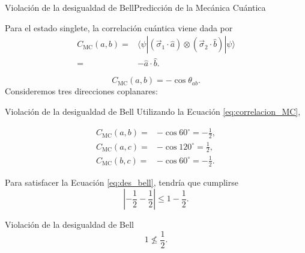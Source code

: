 \begin{frame}{Violación de la desigualdad de Bell}{Predicción de la Mecánica Cuántica}

Para el estado singlete, la correlación cuántica viene dada por
\begin{align*}
	C_{\text{MC}}(a,b)=&\langle\psi|(\vec{\sigma}_1\cdot\hat{a})\otimes(\vec{\sigma}_2\cdot\hat{b})|\psi\rangle
	\\
	=&-\hat{a}\cdot\hat{b}.
\end{align*}

\begin{equation}
	C_{\text{MC}}(a,b)=-\cos\theta_{ab}.
	\label{eq:correlacion_MC}
\end{equation}
Consideremos tres direcciones coplanares:
\begin{center}
\end{center}
\end{frame}


\begin{frame}{Violación de la desigualdad de Bell}{}
Utilizando la Ecuación \ref{eq:correlacion_MC},

\begin{align*}
	C_{\text{MC}}(a,b)=&-\cos60^\circ=-\frac{1}{2},
	\\
	C_{\text{MC}}(a,c)=&-\cos120^\circ=\frac{1}{2},
	\\
	C_{\text{MC}}(b,c)=&-\cos60^\circ=-\frac{1}{2}.
\end{align*}

Para satisfacer la Ecuación \ref{eq:des_bell}, tendría que cumplirse
$$ \left|-\frac{1}{2}-\frac{1}{2}\right|\leq 1-\frac{1}{2}. $$
\begin{block}{Violación de la desigualdad de Bell}
	$$ 1\not\leq\frac{1}{2}. $$
\end{block}
\end{frame}